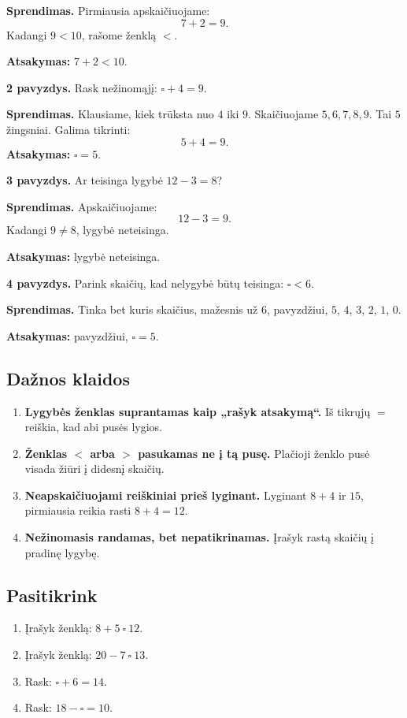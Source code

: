 \textbf{Sprendimas.} Pirmiausia apskaičiuojame:
\[
7+2=9.
\]
Kadangi \(9<10\), rašome ženklą \(<\).

\textbf{Atsakymas:} \(7+2<10\).

\textbf{2 pavyzdys.} Rask nežinomąjį: \(\square+4=9\).

\textbf{Sprendimas.} Klausiame, kiek trūksta nuo \(4\) iki \(9\). Skaičiuojame \(5,6,7,8,9\). Tai \(5\) žingsniai. Galima tikrinti:
\[
5+4=9.
\]
\textbf{Atsakymas:} \(\square=5\).

\textbf{3 pavyzdys.} Ar teisinga lygybė \(12-3=8\)?

\textbf{Sprendimas.} Apskaičiuojame:
\[
12-3=9.
\]
Kadangi \(9\neq 8\), lygybė neteisinga.

\textbf{Atsakymas:} lygybė neteisinga.

\textbf{4 pavyzdys.} Parink skaičių, kad nelygybė būtų teisinga: \(\square<6\).

\textbf{Sprendimas.} Tinka bet kuris skaičius, mažesnis už \(6\), pavyzdžiui, \(5\), \(4\), \(3\), \(2\), \(1\), \(0\).

\textbf{Atsakymas:} pavyzdžiui, \(\square=5\).

\subsection{Dažnos klaidos}

\begin{enumerate}
\item \textbf{Lygybės ženklas suprantamas kaip „rašyk atsakymą“.} Iš tikrųjų \(=\) reiškia, kad abi pusės lygios.
\item \textbf{Ženklas \(<\) arba \(>\) pasukamas ne į tą pusę.} Plačioji ženklo pusė visada žiūri į didesnį skaičių.
\item \textbf{Neapskaičiuojami reiškiniai prieš lyginant.} Lyginant \(8+4\) ir \(15\), pirmiausia reikia rasti \(8+4=12\).
\item \textbf{Nežinomasis randamas, bet nepatikrinamas.} Įrašyk rastą skaičių į pradinę lygybę.
\end{enumerate}

\subsection{Pasitikrink}

\begin{enumerate}
\item Įrašyk ženklą: \(8+5\ \square\ 12\).
\item Įrašyk ženklą: \(20-7\ \square\ 13\).
\item Rask: \(\square+6=14\).
\item Rask: \(18-\square=10\).
\end{enumerate}

